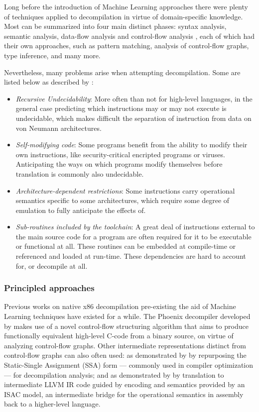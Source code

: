 \documentclass[../main.tex]{subfiles}
\begin{document}
Long before the introduction of Machine Learning approaches there were plenty of
techniques applied to decompilation in virtue of domain-specific knowledge. Most 
can be summarized into four main distinct phases: syntax analysis, semantic analysis,
data-flow analysis and control-flow analysis \cite{cifuentes_reverse_1994}, 
each of which had their own approaches, such as pattern matching, analysis of 
control-flow graphs, type inference, and many more.

Nevertheless, many problems arise when attempting decompilation. Some are listed
below as described by \cite[p.~1-7]{cifuentes_reverse_1994}:
\begin{itemize}
    \item \textit{Recursive Undecidability}: More often than not for high-level 
    languages, in the general case predicting which instructions may or may not 
    execute is undecidable, which makes difficult the separation of instruction from
    data on von Neumann architectures. 
    \item \textit{Self-modifying code}: Some programs benefit from the ability to
    modify their own instructions, like security-critical encripted programs or
    viruses. Anticipating the ways on which programs modify themselves before translation
    is commonly also undecidable.
    \item \textit{Architecture-dependent restrictions}: Some instructions carry
    operational semantics specific to some architectures, which require some degree
    of emulation to fully anticipate the effects of.
    \item \textit{Sub-routines included by the toolchain}: A great deal of instructions
    external to the main source code for a program are often required for it to be
    executable or functional at all. These routines can be embedded at compile-time
    or referenced and loaded at run-time. These dependencies are hard to account for,
    or decompile at all.
\end{itemize}

\subsubsection{Principled approaches}

Previous works on native x86 decompilation pre-existing the aid of Machine Learning
techniques have existed for a while. 
The Phoenix decompiler developed by \cite{brumley_native_2013} makes use of a novel
control-flow structuring algorithm that aims to produce functionally equivalent
high-level C-code from a binary source, on virtue of analyzing control-flow graphs.
Other intermediate representations distinct from control-flow graphs can also
often used: as demonstrated by \cite{van_emmerik_static_2007} by repurposing the 
Static-Single Assignment (SSA) form — commonly used in compiler optimization —
for decompilation analysis; and as demonstrated by \cite{durfina_design_2011} by 
translation to intermediate LLVM IR code guided by encoding and semantics provided
by an ISAC model, an intermediate bridge for the operational semantics in assembly
back to a higher-level language. 
\end{document}
